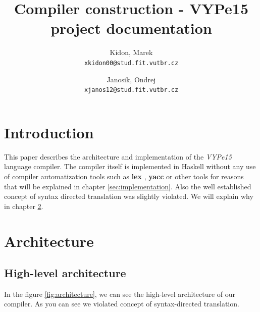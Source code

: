 \documentclass[titlepage]{article}
\title{Compiler construction - VYPe15 project documentation}
\author{
	Kidon, Marek\\
	\texttt{xkidon00@stud.fit.vutbr.cz}
\and 
	Janosik, Ondrej\\
	\texttt{xjanos12@stud.fit.vutbr.cz}
}
\date{}
\begin{document}
\maketitle

\section{Introduction}
This paper describes the architecture and implementation of the \textit{VYPe15} language
compiler. The compiler itself is implemented in Haskell without any use of compiler 
automatization
tools such as \textbf{lex} \cite{lex}, \textbf{yacc} \cite{yacc} or 
other tools for reasons that will be explained in chapter 
\ref{sec:implementation}. Also the well established concept of 
syntax directed translation was slightly violated.
We will explain why in chapter \ref{sec:architecture}.

\section{Architecture}
\label{sec:architecture}

\subsection{High-level architecture}
In the figure \ref{fig:architecture}, we can see the high-level architecture of our
compiler. As you can see we violated concept of syntax-directed translation.
\end{document}
